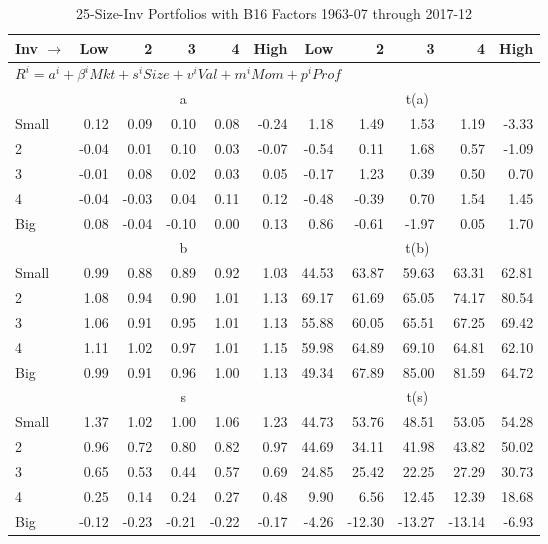
\begin{table}[!ht]
\footnotesize
\centering
\caption{25-Size-Inv Portfolios with B16 Factors 1963-07 through 2017-12}
\begin{tabular}{lrrrrrrrrrr}
  \toprule
    
    Inv $\rightarrow$ & Low & 2 & 3 & 4 & High & Low & 2 & 3 & 4 & High  \\ 
  \midrule
  \multicolumn{11}{l}{$R^i=a^i+\beta^iMkt+s^iSize+v^iVal+m^iMom+p^iProf$}  \\
  
     & \multicolumn{5}{c}{a} & \multicolumn{5}{c}{t(a)}   \\
     \cmidrule(r){2-6} \cmidrule(r){7-11} 
    Small  & 0.12  & 0.09  & 0.10  & 0.08  & -0.24  & 1.18  & 1.49  & 1.53  & 1.19  & -3.33   \\
    2  & -0.04  & 0.01  & 0.10  & 0.03  & -0.07  & -0.54  & 0.11  & 1.68  & 0.57  & -1.09   \\
    3  & -0.01  & 0.08  & 0.02  & 0.03  & 0.05  & -0.17  & 1.23  & 0.39  & 0.50  & 0.70   \\
    4  & -0.04  & -0.03  & 0.04  & 0.11  & 0.12  & -0.48  & -0.39  & 0.70  & 1.54  & 1.45   \\
    Big  & 0.08  & -0.04  & -0.10  & 0.00  & 0.13  & 0.86  & -0.61  & -1.97  & 0.05  & 1.70   \\
    
  
     & \multicolumn{5}{c}{b} & \multicolumn{5}{c}{t(b)}   \\
     \cmidrule(r){2-6} \cmidrule(r){7-11} 
    Small  & 0.99  & 0.88  & 0.89  & 0.92  & 1.03  & 44.53  & 63.87  & 59.63  & 63.31  & 62.81   \\
    2  & 1.08  & 0.94  & 0.90  & 1.01  & 1.13  & 69.17  & 61.69  & 65.05  & 74.17  & 80.54   \\
    3  & 1.06  & 0.91  & 0.95  & 1.01  & 1.13  & 55.88  & 60.05  & 65.51  & 67.25  & 69.42   \\
    4  & 1.11  & 1.02  & 0.97  & 1.01  & 1.15  & 59.98  & 64.89  & 69.10  & 64.81  & 62.10   \\
    Big  & 0.99  & 0.91  & 0.96  & 1.00  & 1.13  & 49.34  & 67.89  & 85.00  & 81.59  & 64.72   \\
    
  
     & \multicolumn{5}{c}{s} & \multicolumn{5}{c}{t(s)}   \\
     \cmidrule(r){2-6} \cmidrule(r){7-11} 
    Small  & 1.37  & 1.02  & 1.00  & 1.06  & 1.23  & 44.73  & 53.76  & 48.51  & 53.05  & 54.28   \\
    2  & 0.96  & 0.72  & 0.80  & 0.82  & 0.97  & 44.69  & 34.11  & 41.98  & 43.82  & 50.02   \\
    3  & 0.65  & 0.53  & 0.44  & 0.57  & 0.69  & 24.85  & 25.42  & 22.25  & 27.29  & 30.73   \\
    4  & 0.25  & 0.14  & 0.24  & 0.27  & 0.48  & 9.90  & 6.56  & 12.45  & 12.39  & 18.68   \\
    Big  & -0.12  & -0.23  & -0.21  & -0.22  & -0.17  & -4.26  & -12.30  & -13.27  & -13.14  & -6.93   \\
    

\end{tabular}
\end{table}
